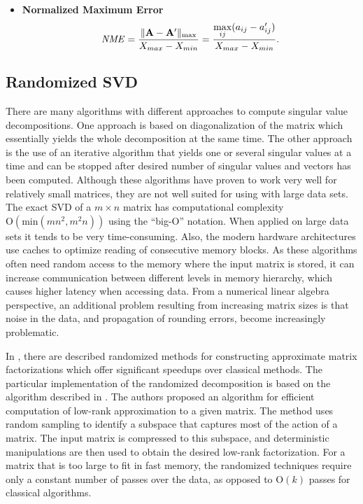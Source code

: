 \begin{itemize}
\item \textbf{Normalized Maximum Error}
\begin{equation}
\mathit{NME} = \frac{\lVert \mathbf{A} - \mathbf{A'} \lVert_{\max}}{X_{max}-X_{min}} = \frac{\max\limits_{ij}(a_{ij} - a'_{ij})}{X_{max}-X_{min}}.
\label{eq:nme-def}
\end{equation}

\end{itemize}

\subsection{Randomized SVD}

There are many algorithms with different approaches to compute singular value decompositions. One approach is based on diagonalization of the matrix which essentially yields the whole decomposition at the same time. The other approach is the use of an iterative algorithm that yields one or several singular values at a time and can be stopped after desired number of singular values and vectors has been computed. Although these algorithms have proven to work very well for relatively small matrices, they are not well suited for using with large data sets. The exact SVD of a $m \times n$ matrix has computational complexity $\mathrm{O}(\mathrm{min}(mn^2, m^2n))$ using the ``big-O'' notation. When applied on large data sets it tends to be very time-consuming. Also, the modern hardware architectures use caches to optimize reading of consecutive memory blocks. As these algorithms often need random access to the memory where the input matrix is stored, it can increase communication between different levels in memory hierarchy, which causes higher latency when accessing data. From a numerical linear algebra perspective, an additional problem resulting from increasing matrix sizes is that noise in the data, and propagation of rounding errors, become increasingly problematic.

In \cite{Candes2011, Woolfe2008, Martinsson2011, Szlam2014}, there are described randomized methods for constructing approximate matrix factorizations which offer significant speedups over classical methods. The particular implementation of the randomized decomposition is based on the algorithm described in \cite{Halko2011}. The authors proposed an algorithm for efficient computation of low-rank approximation to a given matrix. The method uses random sampling to identify a subspace that captures most of the action of a matrix. The input matrix is compressed to this subspace, and deterministic manipulations are then used to obtain the desired low-rank factorization. For a matrix that is too large to fit in fast memory, the randomized techniques require only a constant number of passes over the data, as opposed to $\mathrm{O}(k)$ passes for classical algorithms.

